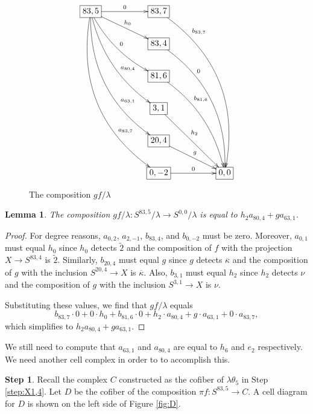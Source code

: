 \documentclass{amsart}
\newtheorem{lemma}[thm]{Lemma}
\theoremstyle{definition}
\newtheorem{step}[thm]{Step}
\newcommand{\map}{\rightarrow}
\newcommand{\Xonefour}{C}
\newcommand{\hsf}{\widetilde{2}}
\newcommand{\kappabar}{\overline{\kappa}}
\begin{document}
\begin{figure}[h!]
\caption{The composition $gf/\lambda$ \label{fig:gf/L}}
\[
\xymatrix{
*+[F]{83,5} \ar[rr]^-{0} \ar[rrd]^-{h_0} \ar@/^-10pt/[rrdd]^-{0} \ar@/^-15pt/[rrddd]^(.55){a_{80,4}} \ar@/^-25pt/[rrdddd]^(.65){a_{63,1}} \ar@/^-35pt/[rrddddd]^(.7){a_{83,7}} && *+[F]{83,7} \ar@/^35pt/[rrddddd]^(.2){b_{83,7}}  && \\
 && *+[F]{83,4} \ar@/^25pt/[rrdddd]^(.3){0}   &&\\
 && *+[F]{81,6} \ar@/^15pt/[rrddd]^(.35){b_{81,6}}  &&\\
 && *+[F]{3,1} \ar[rrdd]^(.45){h_2} &&\\
 && *+[F]{20,4} \ar[rrd]^-{g} &&\\
 && *+[F]{0,-2} \ar[rr]^-{0} && *+[F]{0,0}
}
\]
\end{figure}


\begin{lemma}
\label{lem:gf/L}
The composition $g f/\lambda: S^{83,5}/\lambda \map S^{0,0}/\lambda$
is equal to $h_2  a_{80,4} + g  a_{63,1}$.
\end{lemma}

\begin{proof}
For degree reasons, $a_{0,2}$, $a_{2,-1}$, $b_{83,4}$, and $b_{0,-2}$
must be zero.
Moreover, $a_{0,1}$ must equal $h_0$ since
$h_0$ detects $\hsf$ and the composition of $f$ with
the projection $X \map S^{83,4}$ is $\hsf$.
Similarly, $b_{20,4}$ must equal $g$ since $g$ detects $\kappabar$
and the composition of $g$ with the inclusion
$S^{20,4} \map X$ is $\kappabar$.
Also, $b_{3,1}$ must equal $h_2$ since $h_2$ detects $\nu$
and the composition of $g$ with the inclusion
$S^{3,1} \map X$ is $\nu$.

Substituting these values, we find that $g f/\lambda$ equals
\[
b_{83,7} \cdot 0 +
0 \cdot h_0 +
b_{81,6} \cdot 0 +
h_2 \cdot a_{80,4} + 
g \cdot a_{63,1} +
0 \cdot a_{83,7},
\]
which simplifies to $h_2 a_{80,4} + g a_{63,1}$.
\end{proof}

We still need to compute that $a_{63,1}$ and $a_{80,4}$ are equal
to $h_6$ and $e_2$ respectively.  We need another cell complex
in order to to accomplish this.

\begin{step}
\label{step:D}
Recall the complex $\Xonefour$ constructed as the cofiber of
$\lambda \theta_5$ in Step \ref{step:X1,4}.
Let $D$ be the cofiber of the composition $\pi f: S^{83,5} \map C$.
A cell diagram for $D$ is shown on the left side of Figure \ref{fig:D}.
\end{step}
\end{document}
